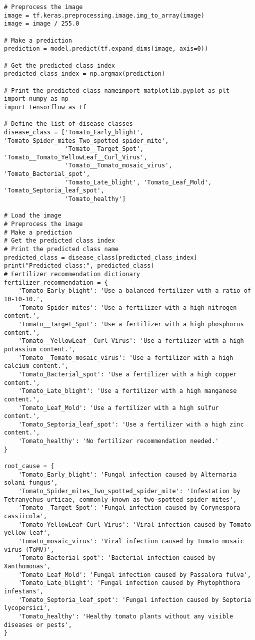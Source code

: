 \documentclass[12pt, English]{article}
\begin{document}
\begin{normalsize}
\begin{verbatim}
# Preprocess the image
image = tf.keras.preprocessing.image.img_to_array(image)
image = image / 255.0

# Make a prediction
prediction = model.predict(tf.expand_dims(image, axis=0))

# Get the predicted class index
predicted_class_index = np.argmax(prediction)

# Print the predicted class nameimport matplotlib.pyplot as plt
import numpy as np
import tensorflow as tf

# Define the list of disease classes
disease_class = ['Tomato_Early_blight', 'Tomato_Spider_mites_Two_spotted_spider_mite',
                 'Tomato__Target_Spot', 'Tomato__Tomato_YellowLeaf__Curl_Virus',
                 'Tomato__Tomato_mosaic_virus', 'Tomato_Bacterial_spot',
                 'Tomato_Late_blight', 'Tomato_Leaf_Mold', 'Tomato_Septoria_leaf_spot',
                 'Tomato_healthy']

# Load the image
# Preprocess the image
# Make a prediction
# Get the predicted class index
# Print the predicted class name
predicted_class = disease_class[predicted_class_index]
print("Predicted class:", predicted_class)
# Fertilizer recommendation dictionary
fertilizer_recommendation = {
    'Tomato_Early_blight': 'Use a balanced fertilizer with a ratio of 10-10-10.',
    'Tomato_Spider_mites': 'Use a fertilizer with a high nitrogen content.',
    'Tomato__Target_Spot': 'Use a fertilizer with a high phosphorus content.',
    'Tomato__YellowLeaf__Curl_Virus': 'Use a fertilizer with a high potassium content.',
    'Tomato__Tomato_mosaic_virus': 'Use a fertilizer with a high calcium content.',
    'Tomato_Bacterial_spot': 'Use a fertilizer with a high copper content.',
    'Tomato_Late_blight': 'Use a fertilizer with a high manganese content.',
    'Tomato_Leaf_Mold': 'Use a fertilizer with a high sulfur content.',
    'Tomato_Septoria_leaf_spot': 'Use a fertilizer with a high zinc content.',
    'Tomato_healthy': 'No fertilizer recommendation needed.'
}

root_cause = {
    'Tomato_Early_blight': 'Fungal infection caused by Alternaria solani fungus',
    'Tomato_Spider_mites_Two_spotted_spider_mite': 'Infestation by Tetranychus urticae, commonly known as two-spotted spider mites',
    'Tomato__Target_Spot': 'Fungal infection caused by Corynespora cassiicola',
    'Tomato_YellowLeaf_Curl_Virus': 'Viral infection caused by Tomato yellow leaf',
    'Tomato_mosaic_virus': 'Viral infection caused by Tomato mosaic virus (ToMV)',  
    'Tomato_Bacterial_spot': 'Bacterial infection caused by Xanthomonas',
    'Tomato_Leaf_Mold': 'Fungal infection caused by Passalora fulva',
    'Tomato_Late_blight': 'Fungal infection caused by Phytophthora infestans',
    'Tomato_Septoria_leaf_spot': 'Fungal infection caused by Septoria lycopersici',
    'Tomato_healthy': 'Healthy tomato plants without any visible diseases or pests',
}


\end{verbatim}
\end{normalsize}
\end{document}
